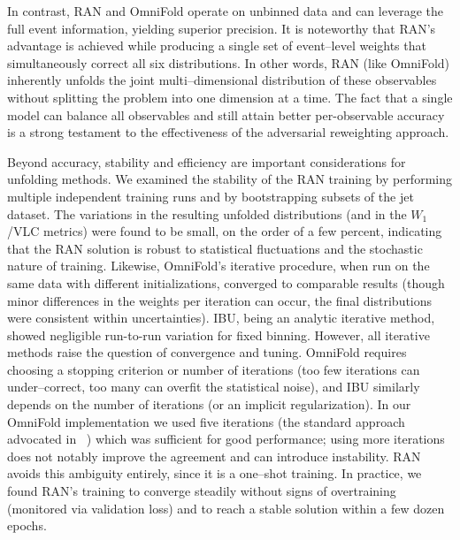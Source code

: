             In contrast, RAN and OmniFold operate on unbinned data and can leverage the full event information, yielding superior precision.
            It is noteworthy that RAN’s advantage is achieved while producing a single set of event--level weights that simultaneously correct all six distributions.
            In other words, RAN (like OmniFold) inherently unfolds the joint multi--dimensional distribution of these observables without splitting the problem into one dimension at a time.
            The fact that a single model can balance all observables and still attain better per-observable accuracy is a strong testament to the effectiveness of the adversarial reweighting approach.

            Beyond accuracy, stability and efficiency are important considerations for unfolding methods.
            We examined the stability of the RAN training by performing multiple independent training runs and by bootstrapping subsets of the jet dataset.
            The variations in the resulting unfolded distributions (and in the $W_1$/VLC metrics) were found to be small, on the order of a few percent, indicating that the RAN solution is robust to statistical fluctuations and the stochastic nature of training.
            Likewise, OmniFold’s iterative procedure, when run on the same data with different initializations, converged to comparable results (though minor differences in the weights per iteration can occur, the final distributions were consistent within uncertainties).
            IBU, being an analytic iterative method, showed negligible run-to-run variation for fixed binning.
            However, all iterative methods raise the question of convergence and tuning.
            OmniFold requires choosing a stopping criterion or number of iterations (too few iterations can under--correct, too many can overfit the statistical noise), and IBU similarly depends on the number of iterations (or an implicit regularization).
            In our OmniFold implementation we used five iterations (the standard approach advocated in ~) which was sufficient for good performance; using more iterations does not notably improve the agreement and can introduce instability.
            RAN avoids this ambiguity entirely, since it is a one--shot training.
            In practice, we found RAN’s training to converge steadily without signs of overtraining (monitored via validation loss) and to reach a stable solution within a few dozen epochs.
